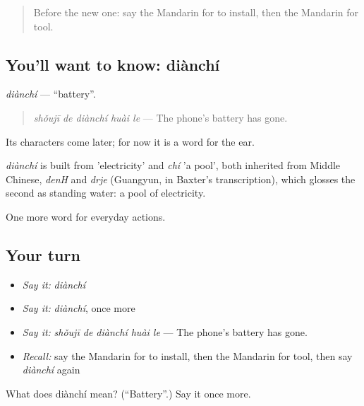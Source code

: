 \begin{quote}
Before the new one: say the Mandarin for to install, then the Mandarin for tool.
\end{quote}

\subsection*{You'll want to know: diànchí}
\emph{diànchí} — \textquotedblleft{}battery\textquotedblright{}.

\begin{quote}
\emph{shǒujī de diànchí huài le} — The phone's battery has gone.
\end{quote}

Its characters come later; for now it is a word for the ear.

\begin{cousinweb}
\emph{diànchí} is built from  'electricity' and \emph{chí} 'a pool', both inherited from Middle Chinese, \emph{denH} and \emph{drje} (Guangyun, in Baxter's transcription), which glosses the second as standing water: a pool of electricity.
\end{cousinweb}

\begin{grammarlens}[title={What you've built}]
One more word for everyday actions.
\end{grammarlens}

\subsection*{Your turn}
\begin{itemize}
\raggedright
  \item \emph{Say it:} \emph{diànchí}
  \item \emph{Say it:} \emph{diànchí}, once more
  \item \emph{Say it:} \emph{shǒujī de diànchí huài le} — The phone's battery has gone.
  \item \emph{Recall:} say the Mandarin for to install, then the Mandarin for tool, then say \emph{diànchí} again
\end{itemize}

\begin{tcolorbox}[breakable,colback=teal!4,colframe=teal!35!black,title={Before you move on}]
What does diànchí mean? (\textquotedblleft{}Battery\textquotedblright{}.) Say it once more.
\end{tcolorbox}

